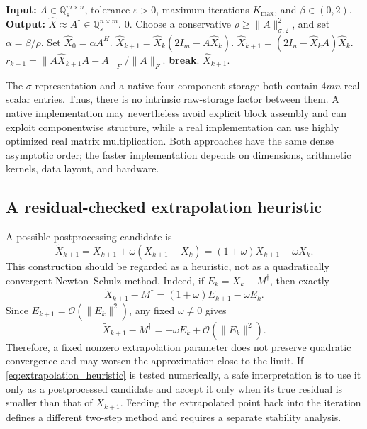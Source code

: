 \documentclass[12pt,a4paper]{article}
\theoremstyle{plain}
\theoremstyle{definition}
\theoremstyle{remark}
\begin{document}
\begin{algorithm}[H]
\caption{Native Newton--Schulz method for a split-quaternion Moore--Penrose inverse.}
\label{alg:native_newton}
\begin{algorithmic}[1]
\STATE \textbf{Input:} \(A\in\mathbb{Q}_s^{m\times n}\), tolerance \(\varepsilon>0\), maximum iterations \(K_{\max}\), and \(\beta\in(0,2)\).
\STATE \textbf{Output:} \(\widehat X\approx A^\dagger\in\mathbb{Q}_s^{n\times m}\).
    \RETURN \(0\).
\ENDIF
\STATE Choose a conservative \(\rho\geq\|A\|_{\sigma,2}^2\), and set \(\alpha=\beta/\rho\).
\STATE Set \(\widehat X_0=\alpha A^H\).
        \STATE \(\widehat X_{k+1}=\widehat X_k(2I_m-A\widehat X_k)\).
    \ELSE
        \STATE \(\widehat X_{k+1}=(2I_n-\widehat X_kA)\widehat X_k\).
    \ENDIF
    \STATE \(r_{k+1}=\|A\widehat X_{k+1}A-A\|_F/\|A\|_F\).
        \STATE \textbf{break}.
    \ENDIF
\ENDFOR
\RETURN \(\widehat X_{k+1}\).
\end{algorithmic}
\end{algorithm}

The \(\sigma\)-representation and a native four-component storage both contain \(4mn\) real scalar entries. Thus, there is no intrinsic raw-storage factor between them. A native implementation may nevertheless avoid explicit block assembly and can exploit componentwise structure, while a real implementation can use highly optimized real matrix multiplication. Both approaches have the same dense asymptotic order; the faster implementation depends on dimensions, arithmetic kernels, data layout, and hardware.

\subsection{A residual-checked extrapolation heuristic}
A possible postprocessing candidate is
\begin{equation} \label{eq:extrapolation_heuristic}
    \widetilde X_{k+1} =X_{k+1}+\omega(X_{k+1}-X_k) =(1+\omega)X_{k+1}-\omega X_k.
\end{equation}
This construction should be regarded as a heuristic, not as a quadratically convergent Newton--Schulz method. Indeed, if \(E_k=X_k-M^\dagger\), then exactly
\begin{equation} \label{eq:extrapolation_error_exact}
    \widetilde X_{k+1}-M^\dagger =(1+\omega)E_{k+1}-\omega E_k.
\end{equation}
Since \(E_{k+1}=\mathcal{O}(\|E_k\|^2)\), any fixed \(\omega\neq0\) gives
\[
    \widetilde X_{k+1}-M^\dagger = -\omega E_k+\mathcal{O}(\|E_k\|^2).
\]
Therefore, a fixed nonzero extrapolation parameter does not preserve quadratic convergence and may worsen the approximation close to the limit. If \eqref{eq:extrapolation_heuristic} is tested numerically, a safe interpretation is to use it only as a postprocessed candidate and accept it only when its true residual is smaller than that of \(X_{k+1}\). Feeding the extrapolated point back into the iteration defines a different two-step method and requires a separate stability analysis.
\end{document}
